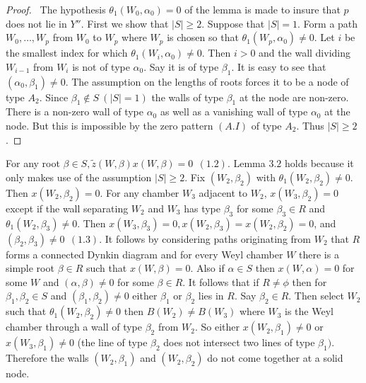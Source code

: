 \documentclass{memo-l}
\theoremstyle{definition}
\theoremstyle{remark}
\numberwithin{section}{chapter}
\numberwithin{equation}{chapter}
\begin{document}
\begin{proof} \ The hypothesis ${\theta}_{1}(W_{0},{\alpha}_{0}) = 0$ of
the lemma is made to insure that $p$ does not lie in $Y''$.  First we show
that $\vert S\vert \ge 2$.  Suppose that $\vert S\vert = 1$.  Form a
path $W_{0},\ldots ,W_{p}$ from $W_{0}$ to $W_{p}$ where $W_{p}$ is chosen
so that ${\theta}_{1}(W_{p},{\alpha}_{0})\ne 0$.  Let $i$ be the smallest
index for which ${\theta}_{1}(W_{i},{\alpha}_{0})\ne 0$.  Then $i > 0$ and
the wall dividing $W_{i-1}$ from $W_{i}$ is not of type ${\alpha}_{0}$.
Say it is of type ${\beta}_{1}$.  It is easy to see that
$({\alpha}_{0},{\beta}_{1}) \ne 0$.  The assumption on the lengths of roots
forces it to be a node of type $A_{2}$.  Since ${\beta}_{1} {\not\in} S \ (\vert
S\vert =1)$ the walls of type ${\beta}_{1}$ at the node are non-zero.
There is a non-zero wall of type ${\alpha}_{0}$ as well as a vanishing wall
of type ${\alpha}_{0}$ at the node.  But this is impossible by the zero
pattern $(A.I)$ of type $A_{2}$.  Thus $\vert S\vert \ge 2$.
\end{proof} 

   For any root ${\beta}  \in  S, \tilde z (W,{\beta})x(W,{\beta}) = 0\
   \ 
(1.2)$.  Lemma $3.2$ holds because it only makes use of the assumption
$\vert S\vert \ge 2$.  Fix $(W_{2},{\beta}_{2})$ with
${\theta}_{1}(W_{2},{\beta}_{2})\ne 0$.  Then $x(W_{2},{\beta}_{2}) = 0$.
For any chamber $W_{3}$ adjacent to $W_{2}$, $x(W_{3},{\beta}_{2}) = 0$ except
if the wall separating $W_{2}$ and $W_{3}$ has type ${\beta}_{3}$ for some
${\beta}_{3}  \in  R$ and ${\theta}_{1}(W_{2},{\beta}_{3})\ne 0$.  Then
$x(W_{3},{\beta}_{3}) = 0, x(W_{2},{\beta}_{3}) = x(W_{2},{\beta}_{2}) = 0$, and
$({\beta}_{2},{\beta}_{3})\ne 0 \ \ (1.3)$.  It follows by considering paths
originating from $W_{2}$ that $R$ forms a connected Dynkin diagram and for
every Weyl chamber $W$ there is a simple root ${\beta}  \in  R$ such that
$x(W,{\beta}) = 0$.  Also if ${\alpha}  \in  S$ then $x(W,{\alpha}) = 0$ for
some $W$ and $({\alpha},{\beta})\ne 0$ for some ${\beta}  \in  R$.  It
follows that if $R\ne {\phi}$ then for ${\beta}_{1},{\beta}_{2}  \in  S$
and $({\beta}_{1},{\beta}_{2})\ne 0$ either ${\beta}_{1}$ or ${\beta}_{2}$
lies in $R$.  Say ${\beta}_{2}  \in  R$.  Then select $W_{2}$ such that
${\theta}_{1}(W_{2},{\beta}_{2})\ne 0$ then $B(W_{2})\ne B(W_{3})$ where
$W_{3}$ is the Weyl chamber through a wall of type ${\beta}_{2}$ from
$W_{2}$.  So either $x(W_{2},{\beta}_{1})\ne 0$ or $x(W_{3},{\beta}_{1})\ne
0$ (the line of type ${\beta}_{2}$ does not intersect two lines of type
${\beta}_{1})$.  Therefore the walls $(W_{2},{\beta}_{1})$ and
$(W_{2},{\beta}_{2})$ do not come together at a solid node.
\end{document}
